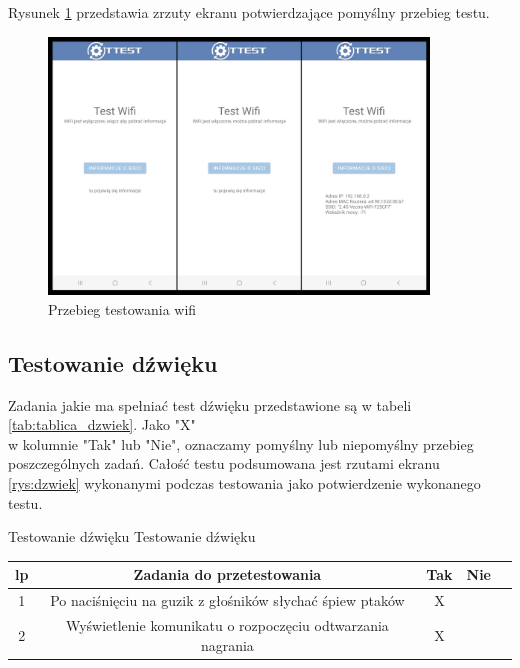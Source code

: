 Rysunek \ref{rys:wifi_5} przedstawia zrzuty ekranu potwierdzające pomyślny przebieg testu.

\begin{figure}[!hbt]
	\begin{center}
		\includegraphics[angle=360, width=0.90\textwidth]{rys/punkt5/wifi.png}
		\caption{Przebieg testowania wifi}
		\label{rys:wifi_5}
	\end{center}
\end{figure} 

\newpage


\subsection{Testowanie dźwięku}

\hspace{0.60cm}Zadania jakie ma spełniać test dźwięku przedstawione są w tabeli \ref{tab:tablica_dzwiek}. Jako "X" \\ w kolumnie "Tak" lub "Nie", oznaczamy pomyślny lub niepomyślny przebieg poszczególnych zadań. Całość testu podsumowana jest rzutami ekranu \ref{rys:dzwiek} wykonanymi podczas testowania jako potwierdzenie wykonanego testu.

\begin{tabela}
	{Testowanie dźwięku}	%
	{Testowanie dźwięku}	%
	{
		\begin{tabular}{|c|c|c|c|c|} \hline
			\textbf{lp} & \textbf{Zadania do przetestowania} & \textbf{Tak} & \textbf{Nie} \\ \hline
			1 & Po naciśnięciu na guzik z głośników słychać śpiew ptaków & X & ~ \\ \hline
			2 & Wyświetlenie komunikatu o rozpoczęciu odtwarzania nagrania & X & ~ \\ \hline
	\end{tabular}	}
	\label{tab:tablica_dzwiek}
\end{tabela}

